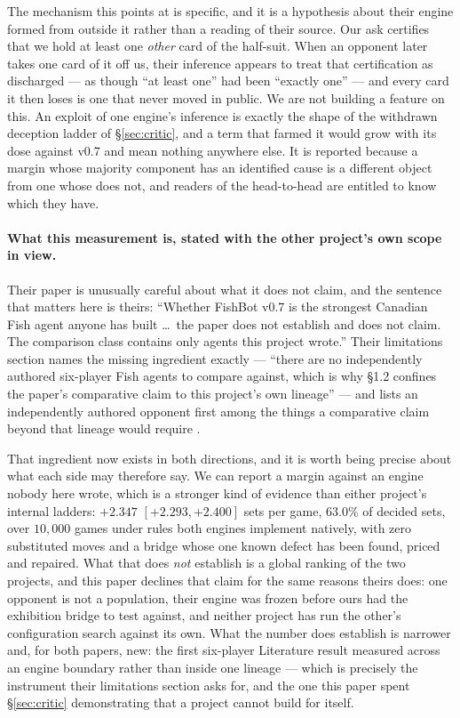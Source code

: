 \documentclass[11pt,a4paper]{article}
\begin{document}
The mechanism this points at is specific, and it is a hypothesis about their
engine formed from outside it rather than a reading of their source. Our ask
certifies that we hold at least one \emph{other} card of the half-suit. When an
opponent later takes one card of it off us, their inference appears to treat
that certification as discharged --- as though ``at least one'' had been
``exactly one'' --- and every card it then loses is one that never moved in
public. We are not building a feature on this. An exploit of one engine's
inference is exactly the shape of the withdrawn deception ladder of
\S\ref{sec:critic}, and a term that farmed it would grow with its dose against
v0.7 and mean nothing anywhere else. It is reported because a margin whose
majority component has an identified cause is a different object from one whose
does not, and readers of the head-to-head are entitled to know which they have.

\paragraph{What this measurement is, stated with the other project's own
scope in view.} Their paper is unusually careful about what it does not
claim, and the sentence that matters here is theirs: ``Whether FishBot v0.7
is the strongest Canadian Fish agent anyone has built \dots\ the paper does
not establish and does not claim. The comparison class contains only agents
this project wrote.'' Their limitations section names the missing
ingredient exactly --- ``there are no independently authored six-player Fish
agents to compare against, which is why \S1.2 confines the paper's
comparative claim to this project's own lineage'' --- and lists an
independently authored opponent first among the things a comparative claim
beyond that lineage would require \citep{dylan2026fishbot}.

That ingredient now exists in both directions, and it is worth being
precise about what each side may therefore say. We can report a margin
against an engine nobody here wrote, which is a stronger kind of evidence
than either project's internal ladders: $+2.347$ $[+2.293, +2.400]$ sets per
game, $63.0\%$ of decided sets, over $10{,}000$ games under rules both engines
implement natively, with zero substituted moves and a bridge whose one known
defect has been found, priced and repaired. What that does \emph{not} establish
is a global ranking of the two projects, and this paper declines that claim
for the same reasons theirs does: one opponent is not a population, their
engine was frozen before ours had the exhibition bridge to test against,
and neither project has run the other's configuration search against its
own. What the number does establish is narrower and, for both papers,
new: the first six-player Literature result measured across an engine
boundary rather than inside one lineage --- which is precisely the
instrument their limitations section asks for, and the one this paper
spent \S\ref{sec:critic} demonstrating that a project cannot build for
itself.
\end{document}
